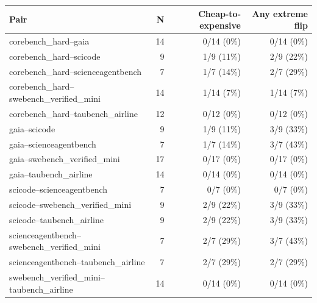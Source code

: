 \begin{tabular}{lrrr}
\toprule
Pair & N & Cheap-to-expensive & Any extreme flip \\
\midrule
corebench\_hard--gaia & 14 & 0/14 (0\%) & 0/14 (0\%) \\
corebench\_hard--scicode & 9 & 1/9 (11\%) & 2/9 (22\%) \\
corebench\_hard--scienceagentbench & 7 & 1/7 (14\%) & 2/7 (29\%) \\
corebench\_hard--swebench\_verified\_mini & 14 & 1/14 (7\%) & 1/14 (7\%) \\
corebench\_hard--taubench\_airline & 12 & 0/12 (0\%) & 0/12 (0\%) \\
gaia--scicode & 9 & 1/9 (11\%) & 3/9 (33\%) \\
gaia--scienceagentbench & 7 & 1/7 (14\%) & 3/7 (43\%) \\
gaia--swebench\_verified\_mini & 17 & 0/17 (0\%) & 0/17 (0\%) \\
gaia--taubench\_airline & 14 & 0/14 (0\%) & 0/14 (0\%) \\
scicode--scienceagentbench & 7 & 0/7 (0\%) & 0/7 (0\%) \\
scicode--swebench\_verified\_mini & 9 & 2/9 (22\%) & 3/9 (33\%) \\
scicode--taubench\_airline & 9 & 2/9 (22\%) & 3/9 (33\%) \\
scienceagentbench--swebench\_verified\_mini & 7 & 2/7 (29\%) & 3/7 (43\%) \\
scienceagentbench--taubench\_airline & 7 & 2/7 (29\%) & 2/7 (29\%) \\
swebench\_verified\_mini--taubench\_airline & 14 & 0/14 (0\%) & 0/14 (0\%) \\
\bottomrule
\end{tabular}
